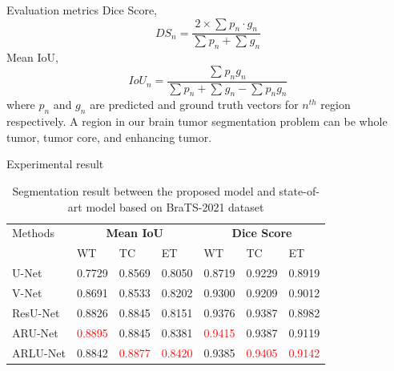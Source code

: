 \documentclass [xcolor=svgnames, t] {beamer}
\begin{document}
\begin{frame}{Evaluation metrics}
\vspace*{\fill}
    Dice Score,
    \begin{equation}
        DS_n = \frac{2 \times \sum_{}p_n\cdot g_n}{\sum_{}p_n + \sum_{}g_n}
    \end{equation}
Mean IoU,
    \begin{equation}
        IoU_n = \frac{\sum_{}p_n g_n}{\sum_{}p_n + \sum_{}g_n - \sum_{}p_n g_n}
    \end{equation}
    where $p_n$ and $g_n$ are predicted and ground truth  vectors for $n^{th}$ region respectively. A region in our brain tumor segmentation problem can be whole tumor, tumor core, and enhancing tumor.  
    \vspace*{\fill}
\end{frame}

\begin{frame}{Experimental result}
\vspace*{\fill}
    \begin{table}[H]
\centering
\caption{Segmentation result between the proposed model and state-of-art model based on BraTS-2021 dataset}
\begin{tabular}{ |p{2.5cm}|p{1cm}|p{1cm}|p{1cm}|p{1cm}|p{1cm}|p{1cm}|  }
\hline
Methods & \multicolumn{3}{c|}{\textbf{Mean IoU}} & \multicolumn{3}{c|}{\textbf{Dice Score}} \\
\cline{2-7}
  & WT & TC & ET & WT & TC & ET\\
\hline
\hline
U-Net \cite{10.1007/978-3-319-24574-4_28} & 0.7729 & 0.8569 & 0.8050 & 0.8719 & 0.9229 & 0.8919\\
\hline
V-Net \cite{Milletari2016VNetFC} & 0.8691 & 0.8533 & 0.8202 & 0.9300 & 0.9209 & 0.9012\\
\hline
ResU-Net \cite{SHEHAB2021404}& 0.8826 & 0.8845 & 0.8151 & 0.9376 & 0.9387 & 0.8982\\
\hline
ARU-Net\cite{MAJI2022103077} & \textcolor{red}{0.8895} & 0.8845 & 0.8381 & \textcolor{red}{0.9415} & 0.9387 & 0.9119\\
\hline
ARLU-Net & 0.8842 & \textcolor{red}{0.8877} & \textcolor{red}{0.8420} & 0.9385 & \textcolor{red}{0.9405} & \textcolor{red}{0.9142}\\
\hline
\end{tabular}
\end{table}
\vspace*{\fill}
\end{frame}
\end{document}

